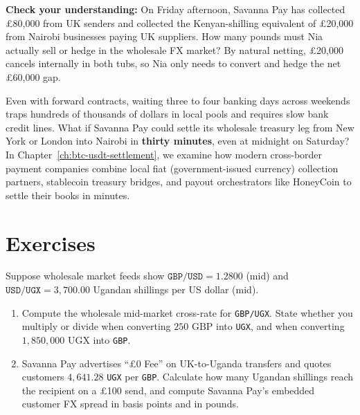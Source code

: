 \begin{walkbox}
\textbf{Check your understanding:} On Friday afternoon, Savanna Pay has collected \pounds 80,000 from UK senders and collected the Kenyan-shilling equivalent of \pounds 20,000 from Nairobi businesses paying UK suppliers. How many pounds must Nia actually sell or hedge in the wholesale FX market? By natural netting, \pounds 20,000 cancels internally in both tubs, so Nia only needs to convert and hedge the net \pounds 60,000 gap.
\end{walkbox}

Even with forward contracts, waiting three to four banking days across weekends traps hundreds of thousands of dollars in local pools and requires slow bank credit lines. What if Savanna Pay could settle its wholesale treasury leg from New York or London into Nairobi in \textbf{thirty minutes}, even at midnight on Saturday? In Chapter~\ref{ch:btc-usdt-settlement}, we examine how modern cross-border payment companies combine local fiat (government-issued currency) collection partners, stablecoin treasury bridges, and payout orchestrators like HoneyCoin to settle their books in minutes.

\section*{Exercises}

\begin{exercise}
Suppose wholesale market feeds show $\texttt{GBP/USD} = 1.2800$ (mid) and $\texttt{USD/UGX} = 3{,}700.00$ Ugandan shillings per US dollar (mid).
\begin{enumerate}
  \item Compute the wholesale mid-market cross-rate for \texttt{GBP/UGX}. State whether you multiply or divide when converting $250\text{ GBP}$ into \texttt{UGX}, and when converting $1{,}850{,}000\text{ UGX}$ into \texttt{GBP}.
  \item Savanna Pay advertises ``\pounds 0 Fee'' on UK-to-Uganda transfers and quotes customers $4{,}641.28$ \texttt{UGX} per \texttt{GBP}. Calculate how many Ugandan shillings reach the recipient on a \pounds 100 send, and compute Savanna Pay's embedded customer FX spread in basis points and in pounds.
\end{enumerate}
\end{exercise}

